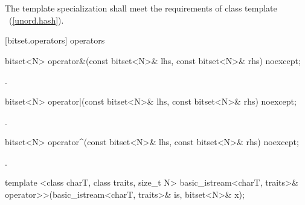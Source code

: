 \begin{itemdescr}
\pnum The template specialization shall meet the requirements of class template
~(\ref{unord.hash}).
\end{itemdescr}


[bitset.operators]{ operators}

%
\begin{itemdecl}
bitset<N> operator&(const bitset<N>& lhs, const bitset<N>& rhs) noexcept;
\end{itemdecl}

\begin{itemdescr}
\pnum
\returns
{}.
\end{itemdescr}

%
\begin{itemdecl}
bitset<N> operator|(const bitset<N>& lhs, const bitset<N>& rhs) noexcept;
\end{itemdecl}

\begin{itemdescr}
\pnum
\returns
{}.
\end{itemdescr}

%
\begin{itemdecl}
bitset<N> operator^(const bitset<N>& lhs, const bitset<N>& rhs) noexcept;
\end{itemdecl}

\begin{itemdescr}
\pnum
\returns
{}.
\end{itemdescr}

%
\begin{itemdecl}
template <class charT, class traits, size_t N>
  basic_istream<charT, traits>&
  operator>>(basic_istream<charT, traits>& is, bitset<N>& x);
\end{itemdecl}

